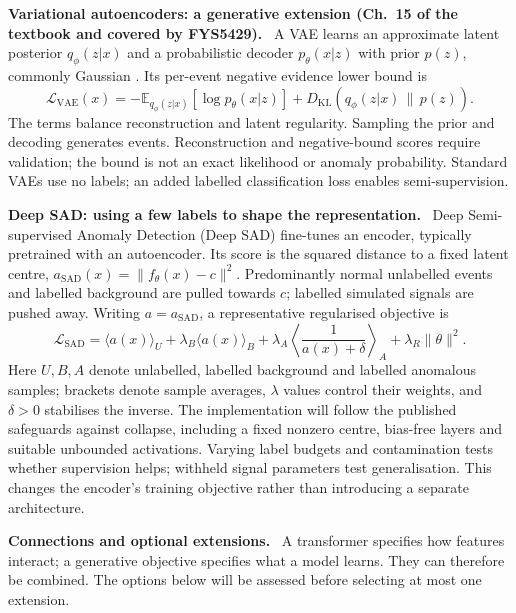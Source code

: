 \documentclass[11pt,a4paper]{article}
\newcommand{\lead}[1]{\textbf{#1}\ }
\begin{document}
\lead{Variational autoencoders: a generative extension (Ch.~15 of the textbook and covered by FYS5429).}
A VAE learns an approximate latent posterior $q_\phi(z|x)$ and a probabilistic decoder $p_\theta(x|z)$ with prior $p(z)$, commonly Gaussian \cite{vae,collidervae}. Its per-event negative evidence lower bound is
\[
 \mathcal{L}_{\mathrm{VAE}}(x)=
 -\mathbb{E}_{q_\phi(z|x)}[\log p_\theta(x|z)]
 +D_{\mathrm{KL}}\!\left(q_\phi(z|x)\,\|\,p(z)\right).
\]
The terms balance reconstruction and latent regularity. Sampling the prior and decoding generates events. Reconstruction and negative-bound scores require validation; the bound is not an exact likelihood or anomaly probability. Standard VAEs use no labels; an added labelled classification loss enables semi-supervision.

\newpage
\lead{Deep SAD: using a few labels to shape the representation.}
Deep Semi-supervised Anomaly Detection (Deep SAD) \cite{sad} fine-tunes an encoder, typically pretrained with an autoencoder. Its score is the squared distance to a fixed latent centre,
$a_{\mathrm{SAD}}(x)=\|f_\theta(x)-c\|^2$.
Predominantly normal unlabelled events and labelled background are pulled towards $c$; labelled simulated signals are pushed away. Writing $a=a_{\mathrm{SAD}}$, a representative regularised objective is
\[
 \mathcal{L}_{\mathrm{SAD}}
 =\langle a(x)\rangle_U+\lambda_B\langle a(x)\rangle_B
 +\lambda_A\left\langle\frac{1}{a(x)+\delta}\right\rangle_A
 +\lambda_R\|\theta\|^2 .
\]
Here $U,B,A$ denote unlabelled, labelled background and labelled anomalous samples; brackets denote sample averages, $\lambda$ values control their weights, and $\delta>0$ stabilises the inverse. The implementation will follow the published safeguards against collapse, including a fixed nonzero centre, bias-free layers and suitable unbounded activations. Varying label budgets and contamination tests whether supervision helps; withheld signal parameters test generalisation. This changes the encoder's training objective rather than introducing a separate architecture.

\lead{Connections and optional extensions.}
A transformer specifies how features interact; a generative objective specifies what a model learns. They can therefore be combined. The options below will be assessed before selecting at most one extension.
\end{document}
